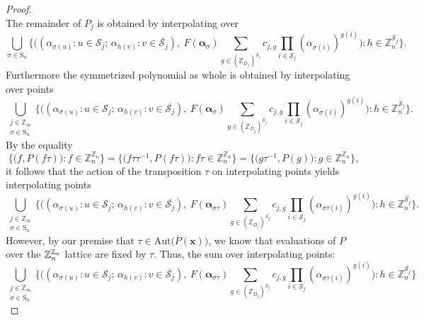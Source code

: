 \begin{proof}
\[ \]
 The remainder of $P_{j}$ is obtained by interpolating over
\[
\bigcup_{\sigma\in\text{S}_{n}}\bigg\{\bigg((\alpha_{\sigma(u)}:u\in\mathscr{S}_{j};\,\alpha_{h(v)}:v\in\overline{\mathscr{S}_{j}}),\:F(\boldsymbol{\alpha}_{\sigma})\sum_{g\in(\mathbb{Z}_{D_{j}})^{\mathscr{S}_{j}}}c_{j,g}\prod_{i\in\mathscr{S}_{j}}(\alpha_{\sigma(i)})^{g(i)}\bigg):h\in\mathbb{Z}_{n}^{\overline{\mathscr{S}_{j}}}\bigg\}.
\]
Furthermore the symmetrized polynomial as whole is obtained by interpolating over points
\[
\bigcup_{\begin{array}{c}
j\in\mathbb{Z}_{m}\\
\sigma\in\text{S}_{n}
\end{array}}\bigg\{\bigg((\alpha_{\sigma(u)}:u\in\mathscr{S}_{j};\,\alpha_{h(v)}:v\in\overline{\mathscr{S}_{j}}),\:F(\boldsymbol{\alpha}_{\sigma})\sum_{g\in(\mathbb{Z}_{D_{j}})^{\mathscr{S}_{j}}}c_{j,g}\prod_{i\in\mathscr{S}_{j}}(\alpha_{\sigma(i)})^{g(i)}\bigg):h\in\mathbb{Z}_{n}^{\overline{\mathscr{S}_{j}}}\bigg\}.
\]
By the equality
\[
\big\{\big(f,P(f\tau)\big):f\in\mathbb{Z}_{n}^{\mathbb{Z}_{n}}\big\}=\big\{\big(f\tau\tau^{-1},P(f\tau)\big):f\tau\in\mathbb{Z}_{n}^{\mathbb{Z}_{n}}\big\}=\big\{\big(g\tau^{-1},P(g)\big):g\in\mathbb{Z}_{n}^{\mathbb{Z}_{n}}\big\},
\]
it follows that the action of the transposition $\tau$ on interpolating points yields interpolating points 
\[
\bigcup_{\begin{array}{c}
j\in\mathbb{Z}_{m}\\
\sigma\in\text{S}_{n}
\end{array}}\bigg\{\bigg((\alpha_{\sigma(u)}:u\in\mathscr{S}_{j};\,\alpha_{h(v)}:v\in\overline{\mathscr{S}_{j}}),\:F(\boldsymbol{\alpha}_{\sigma\tau})\sum_{g\in(\mathbb{Z}_{D_{j}})^{\mathscr{S}_{j}}}c_{j,g}\prod_{i\in\mathscr{S}_{j}}(\alpha_{\sigma\tau(i)})^{g(i)}\bigg):h\in\mathbb{Z}_{n}^{\overline{\mathscr{S}_{j}}}\bigg\}.
\]
However, by our premise that $\tau \in \textrm{Aut}\big(\overline{P}(\mathbf{x})\big)$, we know that evaluations of $P$ over the ${\mathbb Z}_{n}^{{\mathbb Z}_{n}}$ lattice are fixed by $\tau$. Thus, the sum over interpolating points:
\[
\bigcup_{\begin{array}{c}
j\in\mathbb{Z}_{m}\\
\sigma\in\text{S}_{n}
\end{array}}\bigg\{\bigg((\alpha_{\sigma(u)}:u\in\mathscr{S}_{j};\,\alpha_{h(v)}:v\in\overline{\mathscr{S}_{j}}),\:F(\boldsymbol{\alpha}_{\sigma\tau})\sum_{g\in(\mathbb{Z}_{D_{j}})^{\mathscr{S}_{j}}}c_{j,g}\prod_{i\in\mathscr{S}_{j}}(\alpha_{\sigma\tau(i)})^{g(i)}\bigg):h\in\mathbb{Z}_{n}^{\overline{\mathscr{S}_{j}}}\bigg\}
\]
\end{proof}
